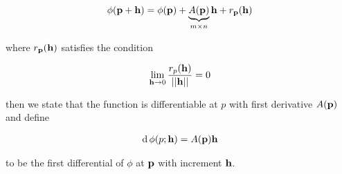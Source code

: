 \begin{align}
  \phi(\mathbf{p} + \mathbf{h}) =   \phi(\mathbf{p}) + \underbrace{A(\mathbf{p})}_{m \times n}\mathbf{h} + r_{\mathbf{p}}(\mathbf{h})
\end{align}

where $r_{\mathbf{p}}(\mathbf{h})$ satisfies the condition

\begin{align*}
  \lim_{\mathbf{h}\to 0} \frac{r_p(\mathbf{h})}{||\mathbf{h}||} = 0
\end{align*}

then we state that the function is differentiable at $p$ with first derivative $A(\mathbf{p})$ and define

\begin{align}
  \operatorname{\text{d}} \phi(p ; \mathbf{h}) = A(\mathbf{p})\mathbf{h} \label{eqn:vecDifferential}
\end{align}

to be the first differential of $\phi$ at $\mathbf{p}$ with increment $\mathbf{h}$.


